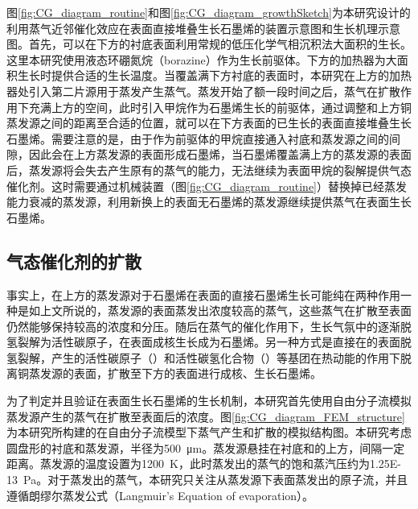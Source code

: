     图\ref{fig:CG_diagram_routine}和图\ref{fig:CG_diagram_growthSketch}为本研究设计的利用蒸气近邻催化效应在表面直接堆叠生长石墨烯的装置示意图和生长机理示意图。首先，可以在下方的衬底表面利用常规的低压化学气相沉积法大面积的生长。这里本研究使用液态环硼氮烷（borazine）作为生长前驱体。下方的加热器为大面积生长时提供合适的生长温度。当覆盖满下方衬底的表面时，本研究在上方的加热器处引入第二片源用于蒸发产生蒸气。蒸发开始了额一段时间之后，蒸气在扩散作用下充满上方的空间，此时引入甲烷作为石墨烯生长的前驱体，通过调整和上方铜蒸发源之间的距离至合适的位置，就可以在下方表面的已生长的表面直接堆叠生长石墨烯。需要注意的是，由于作为前驱体的甲烷直接通入衬底和蒸发源之间的间隙，因此会在上方蒸发源的表面形成石墨烯，当石墨烯覆盖满上方的蒸发源的表面后，蒸发源将会失去产生原有的蒸气的能力，无法继续为表面甲烷的裂解提供气态催化剂。这时需要通过机械装置（图\ref{fig:CG_diagram_routine}）替换掉已经蒸发能力衰减的蒸发源，利用新换上的表面无石墨烯的蒸发源继续提供蒸气在表面生长石墨烯。

    \subsection{气态催化剂的扩散}
    \label{CG:FEM_CuVapor}
    事实上，在上方的蒸发源对于石墨烯在表面的直接石墨烯生长可能纯在两种作用\chinesecolon 一种是如上文所说的，蒸发源的表面蒸发出浓度较高的蒸气，这些蒸气在扩散至表面仍然能够保持较高的浓度和分压。随后在蒸气的催化作用下，生长气氛中的逐渐脱氢裂解为活性碳原子，在表面成核生长成为石墨烯。另一种方式是直接在的表面脱氢裂解，产生的活性碳原子（）和活性碳氢化合物（）等基团在热动能的作用下脱离铜蒸发源的表面，扩散至下方的表面进行成核、生长石墨烯。

    为了判定并且验证在表面生长石墨烯的生长机制，本研究首先使用自由分子流模拟蒸发源产生的蒸气在扩散至表面后的浓度。图\ref{fig:CG_diagram_FEM_structure}为本研究所构建的在自由分子流模型下蒸气产生和扩散的模拟结构图。本研究考虑圆盘形的衬底和蒸发源，半径为\SI{500}{\micro\meter}。蒸发源悬挂在衬底和的上方，间隔一定距离。蒸发源的温度设置为\SI{1200}{\kelvin}，此时蒸发出的蒸气的饱和蒸汽压约为\SI{1.25E-13}{\pascal}。对于蒸发出的蒸气，本研究只关注从蒸发源下表面蒸发出的原子流，并且遵循朗缪尔蒸发公式（Langmuir’s Equation of evaporation）。
    
